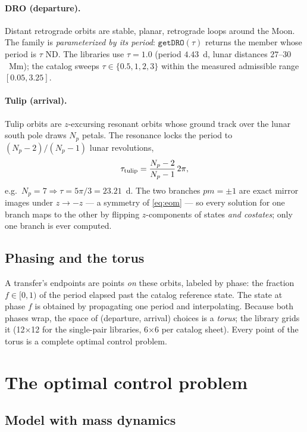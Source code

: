 \documentclass[11pt]{article}
\begin{document}
\paragraph{DRO (departure).} Distant retrograde orbits are stable, planar,
retrograde loops around the Moon. The family is \emph{parameterized by its
period}: $\texttt{getDRO}(\tau)$ returns the member whose period is $\tau$
ND. The libraries use $\tau = 1.0$ (period $4.43$~d, lunar distances
$27$--$30$~Mm); the catalog sweeps $\tau \in \{0.5, 1, 2, 3\}$ within the
measured admissible range $[0.05, 3.25]$.

\paragraph{Tulip (arrival).} Tulip orbits are $z$-excursing resonant orbits
whose ground track over the lunar south pole draws $N_p$ petals. The
resonance locks the period to $(N_p-2)/(N_p-1)$ lunar revolutions,
\begin{equation}
\tau_{\rm tulip} = \frac{N_p-2}{N_p-1}\,2\pi ,
\end{equation}
e.g.\ $N_p=7 \Rightarrow \tau = 5\pi/3 = 23.21$~d. The two branches
$pm=\pm1$ are exact mirror images under $z\to-z$ --- a symmetry of
\eqref{eq:eom} --- so every solution for one branch maps to the other by
flipping $z$-components of states \emph{and costates}; only one branch is
ever computed.

\subsection{Phasing and the torus}

A transfer's endpoints are points \emph{on} these orbits, labeled by phase:
the fraction $f\in[0,1)$ of the period elapsed past the catalog reference
state. The state at phase $f$ is obtained by propagating one period and
interpolating. Because both phases wrap, the space of (departure, arrival)
choices is a \emph{torus}; the library grids it (12$\times$12 for the
single-pair libraries, 6$\times$6 per catalog sheet). Every point of the
torus is a complete optimal control problem.

\section{The optimal control problem}

\subsection{Model with mass dynamics}
\end{document}
